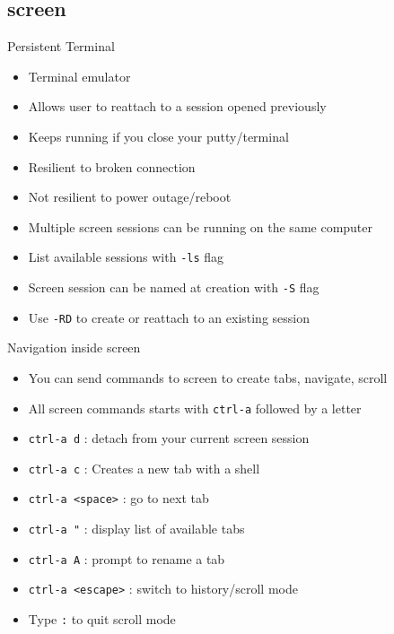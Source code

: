 \subsection{screen}

\begin{frame}{Persistent Terminal}
\begin{itemize}
\pause \item Terminal emulator
\pause \item Allows user to reattach to a session opened previously
\pause \item Keeps running if you close your putty/terminal
\pause \item Resilient to broken connection
\pause \item Not resilient to power outage/reboot
\pause \item Multiple screen sessions can be running on the same computer
\pause \item List available sessions with \texttt{-ls} flag
\pause \item Screen session can be named at creation with \texttt{-S} flag
\pause \item Use \texttt{-RD} to create or reattach to an existing session
\end{itemize}
\end{frame}

\begin{frame}{Navigation inside screen}
\begin{itemize}
  \pause \item You can send commands to screen to create tabs, navigate, scroll
  \pause \item All screen commands starts with \texttt{ctrl-a} followed by a letter
  \pause \item \texttt{ctrl-a d} : detach from your current screen session
  \pause \item \texttt{ctrl-a c} : Creates a new tab with a shell
  \pause \item \texttt{ctrl-a <space>} : go to next tab
  \pause \item \texttt{ctrl-a "} : display list of available tabs
  \pause \item \texttt{ctrl-a A} : prompt to rename a tab
  \pause \item \texttt{ctrl-a <escape>} : switch to history/scroll mode
  \pause \item Type \texttt{:} to quit scroll mode
\end{itemize}
\end{frame}

